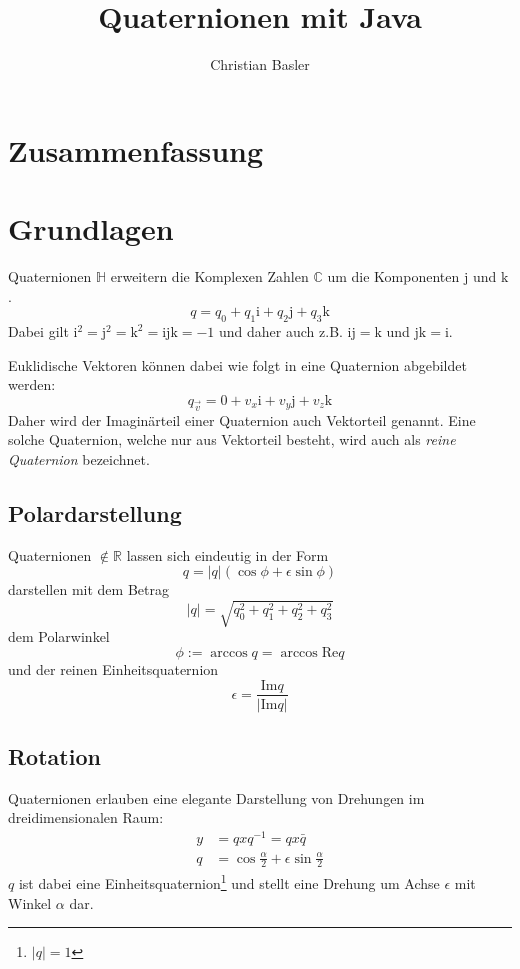 \documentclass[12pt]{article}
\title{Quaternionen mit Java}
\author{Christian Basler}
\date{}
\begin{document}
  \maketitle

  \tableofcontents

  \section{Zusammenfassung}



  \section{Grundlagen}

  Quaternionen $\mathbb{H}$ erweitern die Komplexen Zahlen $\mathbb{C}$ um die Komponenten $\mathrm{j}$ und $\mathrm{k}$.
  $$ q = q_0 + q_1 \mathrm{i} + q_2 \mathrm{j} + q_3 \mathrm{k} $$
  Dabei gilt $\mathrm{i}^2 = \mathrm{j}^2 = \mathrm{k}^2 = \mathrm{i}\mathrm{j}\mathrm{k} = -1$ und daher auch z.B. $\mathrm{i}\mathrm{j} = \mathrm{k}$ und $\mathrm{j}\mathrm{k} = \mathrm{i}$.

  Euklidische Vektoren können dabei wie folgt in eine Quaternion abgebildet werden:
  $$ q_{\vec{v}} = 0 + v_x \mathrm{i} + v_y \mathrm{j} + v_z \mathrm{k} $$
  Daher wird der Imaginärteil einer Quaternion auch Vektorteil genannt. Eine solche Quaternion, welche nur aus Vektorteil besteht, wird auch als \textit{reine Quaternion} bezeichnet.


  \subsection{Polardarstellung}

  Quaternionen $\notin \mathbb{R}$ lassen sich eindeutig in der Form
  $$ q = \lvert q \rvert (\cos{\phi} + \epsilon \sin{\phi}) $$
  darstellen mit dem Betrag
  $$ \lvert q \rvert = \sqrt{q_0^2 + q_1^2 + q_2^2 + q_3^2} $$
  dem Polarwinkel
  $$ \phi := \arccos{q} = \arccos{\mathrm{Re} q} $$
  und der reinen Einheitsquaternion
  $$ \epsilon = \frac{\mathrm{Im} q}{\lvert \mathrm{Im} q \rvert} $$


  \subsection{Rotation}

  Quaternionen erlauben eine elegante Darstellung von Drehungen im dreidimensionalen Raum:
  \begin{align*}
    y &= q x q^{-1} = q x \bar{q} \\
	q &= \cos{\frac{\alpha}{2}} + \epsilon \sin{\frac{\alpha}{2}}
  \end{align*}
  $q$ ist dabei eine Einheitsquaternion\footnote{$\lvert q \rvert = 1$} und stellt eine Drehung um Achse $\epsilon$ mit Winkel $\alpha$ dar.
\end{document}
